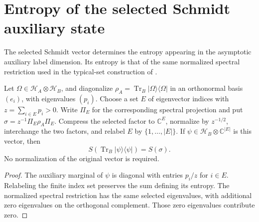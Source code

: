 \section{Entropy of the selected Schmidt auxiliary state}

The selected Schmidt vector determines the entropy appearing in the
asymptotic auxiliary label dimension. Its entropy is that of the same
normalized spectral restriction used in the typical-set construction
of \cite[Section~8]{OpenAI2026AreaLaw}.

\begin{theorem}
  \label{thm:selected_schmidt_auxiliary_entropy}
  \leanok
  Let $\Omega\in\mathcal H_A\otimes\mathcal H_B$, and diagonalize
  $\rho_A=\operatorname{Tr}_B|\Omega\rangle\langle\Omega|$
  in an orthonormal basis $(e_i)$, with eigenvalues $(p_i)$.
  Choose a set $E$ of eigenvector indices with
  $z=\sum_{i\in E}p_i>0$. Write $\Pi_E$ for the corresponding
  spectral projection and put $\sigma=z^{-1}\Pi_E\rho_A\Pi_E$.
  Compress the selected factor to $\mathbb C^E$, normalize by
  $z^{-1/2}$, interchange the two factors, and relabel $E$ by
  $\{1,\ldots,|E|\}$. If $\psi\in\mathcal H_B\otimes\mathbb C^{|E|}$
  is this vector, then
  \[
    S\!\left(\operatorname{Tr}_B|\psi\rangle\langle\psi|\right)
    =S(\sigma).
  \]
  No normalization of the original vector is required.
\end{theorem}
\begin{proof}
  \leanok
  The auxiliary marginal of $\psi$ is diagonal with entries $p_i/z$
  for $i\in E$. Relabeling the finite index set preserves the sum
  defining its entropy. The normalized spectral restriction has the
  same selected eigenvalues, with additional zero eigenvalues on the
  orthogonal complement. Those zero eigenvalues contribute zero.
\end{proof}
